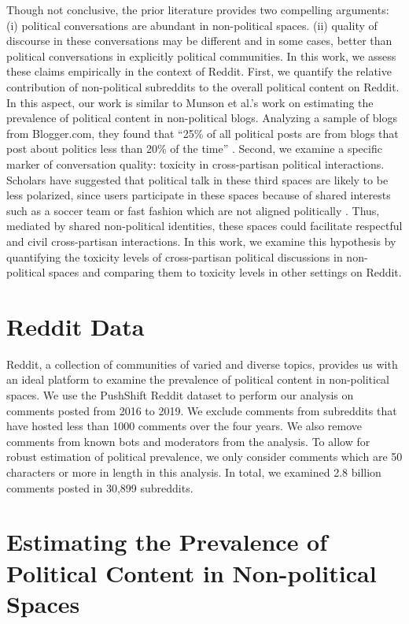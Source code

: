 \documentclass[letterpaper]{article} %
\begin{document}
Though not conclusive, the prior literature provides two compelling arguments: (i) political conversations are abundant in non-political spaces. (ii) quality of discourse in these conversations may be different and in some cases, better than political conversations in explicitly political communities. In this work, we assess these claims empirically in the context of Reddit. First, we quantify the relative contribution of non-political subreddits to the overall political content on Reddit. In this aspect, our work is similar to Munson et al.'s work on estimating the prevalence of political content in non-political blogs. Analyzing a sample of blogs from Blogger.com, they found that ``25\% of all political posts are from blogs that post about politics less than 20\% of the time'' \cite{munson2011prevalence}. Second, we examine a specific marker of conversation quality: toxicity in cross-partisan political interactions. Scholars have suggested that political talk in these third spaces are likely to be less polarized, since users participate in these spaces because of shared interests such as a soccer team or fast fashion which are not aligned politically \cite{wojcieszak2009online,wright2015third}. Thus, mediated by shared non-political identities, these spaces could facilitate respectful and civil cross-partisan interactions. In this work, we examine this hypothesis by quantifying the toxicity levels of cross-partisan political discussions in non-political spaces and comparing them to toxicity levels in other settings on Reddit.

\section{Reddit Data}
Reddit, a collection of communities of varied and diverse topics, provides us with an ideal platform to examine the prevalence of political content in non-political spaces. We use the PushShift Reddit dataset \cite{baumgartner2020pushshift} to perform our analysis on comments posted from 2016 to 2019. We exclude comments from subreddits that have hosted less than 1000 comments over the four years. We also remove comments from known bots and moderators from the analysis. To allow for robust estimation of political prevalence, we only consider comments which are 50 characters or more in length in this analysis. In total, we examined 2.8 billion comments posted in 30,899 subreddits.


\section{Estimating the Prevalence of Political Content in Non-political Spaces}\label{framework}
\end{document}
